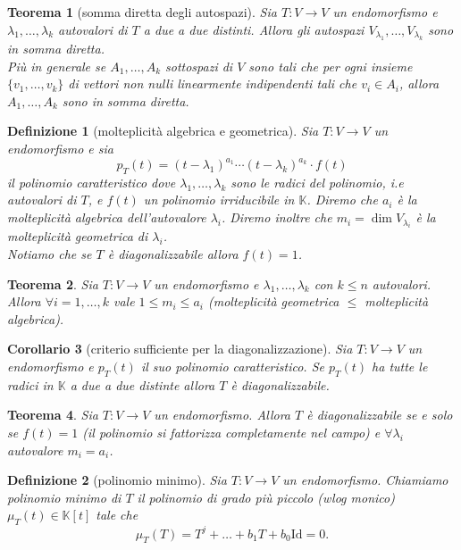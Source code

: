 \documentclass[9pt, a4paper]{article}
\newcommand{\K}{\mathbb{K}}
\newcommand{\Id}{\mathrm{Id}}
\theoremstyle{mythm}
\newtheorem{definition}{Definizione}[section]
\newtheorem{thm}{Teorema}[section]
\newtheorem{corollary}[thm]{Corollario}
\begin{document}
\begin{thm}[somma diretta degli autospazi]
	Sia $ T \colon V \to V $ un endomorfismo e $ \lambda_1, \ldots, \lambda_k $ autovalori di $ T $ a due a due distinti. Allora gli autospazi $ V_{\lambda_1}, \ldots, V_{\lambda_k} $ sono in somma diretta. \\
	Più in generale se $ A_1, \ldots, A_k $ sottospazi di $ V $ sono tali che per ogni insieme $ \{v_1, \ldots, v_k\} $ di vettori non nulli linearmente indipendenti tali che $ v_i \in A_i $, allora $ A_1, \ldots, A_k $ sono in somma diretta. 
\end{thm}

\begin{definition}[molteplicità algebrica e geometrica]
	Sia $ T \colon V \to V $ un endomorfismo e sia \[p_T(t) = (t - \lambda_1)^{a_1} \cdots (t - \lambda_k)^{a_k} \cdot f(t)\] il polinomio caratteristico dove $ \lambda_1, \ldots, \lambda_k $ sono le radici del polinomio, i.e autovalori di $ T $, e $ f(t) $ un polinomio irriducibile in $ \K $. Diremo che $ a_i $ è la molteplicità algebrica dell'autovalore $ \lambda_i $. Diremo inoltre che $ m_i = \dim V_{\lambda_i} $ è la molteplicità geometrica di $ \lambda_i $. \\
	Notiamo che se $ T $ è diagonalizzabile allora $ f(t) = 1 $. 
\end{definition}

\begin{thm}
	Sia $ T \colon V \to V $ un endomorfismo e $ \lambda_1, \ldots, \lambda_k $ con $ k \leq n $ autovalori. Allora $ \forall i = 1, \ldots, k $ vale $ 1 \leq m_i \leq a_i $ (molteplicità geometrica $ \leq $ molteplicità algebrica). 
\end{thm}

\begin{corollary}[criterio sufficiente per la diagonalizzazione]
	Sia $ T \colon V \to V $ un endomorfismo e $ p_T(t) $ il suo polinomio caratteristico. Se $ p_T(t) $ ha tutte le radici in $ \K $ a due a due distinte allora $ T $ è diagonalizzabile. 
\end{corollary}

\begin{thm}
	Sia $ T \colon V \to V $ un endomorfismo. Allora $ T $ è diagonalizzabile se e solo se $ f(t) = 1 $ (il polinomio si fattorizza completamente nel campo) e $ \forall \lambda_i $ autovalore $ m_i = a_i $. 
\end{thm}

\begin{definition}[polinomio minimo]
	Sia $ T \colon V \to V $ un endomorfismo. Chiamiamo polinomio minimo di $ T $ il polinomio di grado più piccolo (\emph{wlog} monico) $ \mu_T(t) \in \K[t] $ tale che \[\mu_T(T) = T^j + \ldots + b_1 T + b_0 \Id = 0.\] 
\end{definition}
\end{document}
